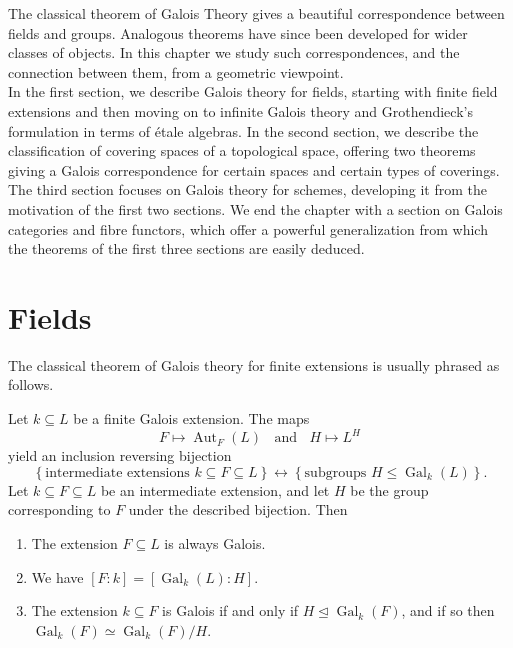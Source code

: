 \documentclass[11pt,openany]{book} %
\begin{document}
The classical theorem of Galois Theory gives a beautiful correspondence between fields and groups. Analogous theorems have since been developed for wider classes of objects. In this chapter we study such correspondences, and the connection between them, from a geometric viewpoint. \\

In the first section, we describe Galois theory for fields, starting with finite field extensions and then moving on to infinite Galois theory and Grothendieck's formulation in terms of \'etale algebras.
In the second section, we describe the classification of covering spaces of a topological space, offering two theorems giving a Galois correspondence for certain spaces and certain types of coverings.
The third section focuses on Galois theory for schemes, developing it from the motivation of the first two sections. We end the chapter with a section on Galois categories and fibre functors, which offer a powerful generalization from which the theorems of the first three sections are easily deduced.


\section{Fields} \label{secgalfld}

The classical theorem of Galois theory for finite extensions is usually phrased as follows.\\

\begin{theorem} \label{galfinfld}
Let $k \subseteq L$ be a finite Galois extension. The maps
\[
F \mapsto \operatorname{Aut}_F(L) \;\; \text{ and } \;\; H \mapsto L^H
\]
yield an inclusion reversing bijection
\[
\left\lbrace \text{intermediate extensions } k \subseteq F \subseteq L \right\rbrace \longleftrightarrow \left\lbrace \text{subgroups } H \leq \operatorname{Gal}_k(L) \right\rbrace.
\]
Let $k \subseteq F \subseteq L$ be an intermediate extension, and let $H$ be the group corresponding to $F$ under the described bijection. Then
\begin{enumerate}
	\item The extension $F \subseteq L$ is always Galois.
    \item We have $[F : k] = [\operatorname{Gal}_k(L) : H]$.
    \item The extension $k \subseteq F$ is Galois if and only if $H \trianglelefteq \operatorname{Gal}_k(F)$, and if so then $\operatorname{Gal}_k(F) \simeq \operatorname{Gal}_k(F)/H$.
\end{enumerate}
\end{theorem}
\end{document}
